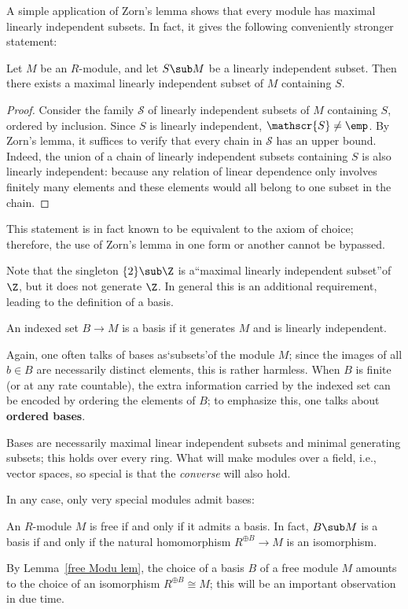 A simple application of Zorn's lemma shows that every module has maximal linearly independent subsets. In fact, it gives the following conveniently stronger statement:
\begin{lemma}\label{Maximal lin inde}
Let $M$ be an $R$-module, and let $S\sub M$ be a linearly independent subset. Then there exists a maximal linearly independent subset of $M$ containing $S$.
\end{lemma}
\begin{proof}
Consider the family $\mathscr{S}$ of linearly independent subsets of $M$ containing $S$,
ordered by inclusion. Since $S$ is linearly independent, $\mathscr{S}\neq\emp$. By Zorn's lemma, it
suffices to verify that every chain in $\mathscr{S}$ has an upper bound. Indeed, the union of a chain of linearly independent subsets containing $S$ is also linearly independent: because any relation of linear dependence only involves finitely many elements and these elements would all belong to one subset in the chain.
\end{proof}
\begin{remark}
This statement is in fact known to be equivalent to the axiom of choice; therefore, the use of Zorn's lemma in one form or another cannot be bypassed.
\end{remark}
Note that the singleton $\{2\}\sub\Z $ is a“maximal linearly independent subset”of $\Z$, but it does not generate $\Z$. In general this is an additional requirement, leading to the definition of a basis.
\begin{definition}
An indexed set $B\to M$ is a basis if it generates $M$ and is linearly independent.
\end{definition}
Again, one often talks of bases as‘subsets’of the module $M$; since the images of all $b\in B$ are necessarily distinct elements, this is rather harmless. When $B$ is finite (or at any rate countable), the extra information carried by the indexed set can be encoded by ordering the elements of $B$; to emphasize this, one talks about \textbf{ordered bases}.\par
Bases are necessarily maximal linear independent subsets and minimal generating subsets; this holds over every ring. What will make modules over a field, i.e., vector spaces, so special is that the \textit{converse} will also hold.\par
In any case, only very special modules admit bases:
\begin{lemma}\label{free Modu lem}
An $R$-module $M$ is free if and only if it admits a basis. In fact, $B\sub M$ is a basis if and only if the natural homomorphism $R^{\oplus B}\to M$ is an isomorphism.
\end{lemma}
By Lemma~\ref{free Modu lem}, the choice of a basis $B$ of a free module $M$ amounts to the choice of an isomorphism $R^{\oplus B}\cong M$; this will be an important observation in due time.
